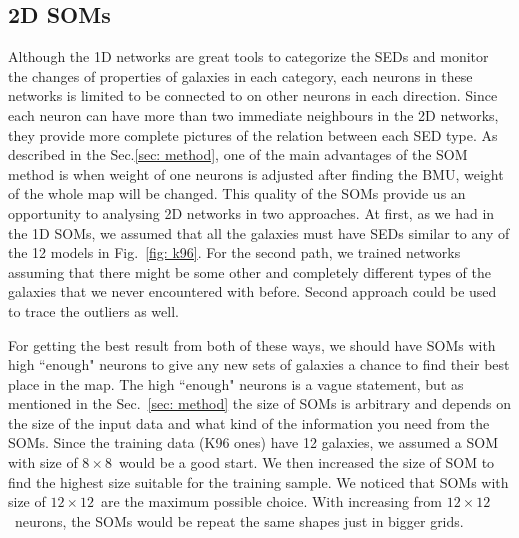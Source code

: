     \subsection{2D SOMs}
    \label{sec: 2D}
    Although the 1D networks are great tools to categorize the SEDs and monitor the changes of properties of galaxies in each category, each neurons in these networks is limited to be connected to on other neurons in each direction.
    Since each neuron can have more than two immediate neighbours in the 2D networks, they provide more complete pictures of the relation between each SED type.
    As described in the Sec.\ref{sec: method}, one of the main advantages of the SOM method is when weight of one neurons is adjusted after finding the BMU, weight of the whole map will be changed.
    This quality of the SOMs provide us an opportunity to analysing 2D networks in two approaches. 
    At first, as we had in the 1D SOMs, we assumed that all the galaxies must have SEDs similar to any of the 12 models in Fig.~\ref{fig: k96}.
    For the second path, we trained networks assuming that there might be some other and completely different types of the galaxies that we never encountered with before.
    Second approach could be used to trace the outliers as well.
    
    For getting the best result from both of these ways, we should have SOMs with high ``enough"  neurons to give any new sets of galaxies a chance to find their best place in the map.
    The  high ``enough"  neurons is a vague statement, but as mentioned in the Sec.~\ref{sec: method} the size of SOMs is arbitrary and depends on the size of the input data and what kind of the information you need from the SOMs.
    Since the training data (K96 ones) have 12 galaxies, we assumed a SOM with size of $8\times8$~would be a good start.
    We then increased the size of SOM to find the highest size suitable for the training sample.
    We noticed that SOMs with size of $12\times12$~are the maximum possible choice.
    With increasing from $12\times12$~neurons, the SOMs would be repeat the same shapes just in bigger grids.
    

